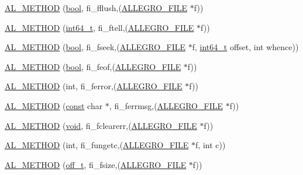 \begin{DoxyCompactItemize}
\item 
\hyperlink{struct_a_l_l_e_g_r_o___f_i_l_e___i_n_t_e_r_f_a_c_e_a03a8721e51960d8219a89e9d731c7f28}{A\+L\+\_\+\+M\+E\+T\+H\+OD} (\hyperlink{astdbool_8h_abb452686968e48b67397da5f97445f5b}{bool}, fi\+\_\+fflush,(\hyperlink{file_8h_a9c6d4681b238d8c79191fd6fcc4bd6f8}{A\+L\+L\+E\+G\+R\+O\+\_\+\+F\+I\+LE} $\ast$f))
\item 
\hyperlink{struct_a_l_l_e_g_r_o___f_i_l_e___i_n_t_e_r_f_a_c_e_acee07e3ccb2fa9cf66827539f3fa2cb6}{A\+L\+\_\+\+M\+E\+T\+H\+OD} (\hyperlink{alwatcom_8h_aa028d750c854cd520247fcab322e276c}{int64\+\_\+t}, fi\+\_\+ftell,(\hyperlink{file_8h_a9c6d4681b238d8c79191fd6fcc4bd6f8}{A\+L\+L\+E\+G\+R\+O\+\_\+\+F\+I\+LE} $\ast$f))
\item 
\hyperlink{struct_a_l_l_e_g_r_o___f_i_l_e___i_n_t_e_r_f_a_c_e_a945082117b99130a77ba7d38bd20a5e4}{A\+L\+\_\+\+M\+E\+T\+H\+OD} (\hyperlink{astdbool_8h_abb452686968e48b67397da5f97445f5b}{bool}, fi\+\_\+fseek,(\hyperlink{file_8h_a9c6d4681b238d8c79191fd6fcc4bd6f8}{A\+L\+L\+E\+G\+R\+O\+\_\+\+F\+I\+LE} $\ast$f, \hyperlink{alwatcom_8h_aa028d750c854cd520247fcab322e276c}{int64\+\_\+t} offset, int whence))
\item 
\hyperlink{struct_a_l_l_e_g_r_o___f_i_l_e___i_n_t_e_r_f_a_c_e_a433eb41daea0bedad5809b0b5797e2e3}{A\+L\+\_\+\+M\+E\+T\+H\+OD} (\hyperlink{astdbool_8h_abb452686968e48b67397da5f97445f5b}{bool}, fi\+\_\+feof,(\hyperlink{file_8h_a9c6d4681b238d8c79191fd6fcc4bd6f8}{A\+L\+L\+E\+G\+R\+O\+\_\+\+F\+I\+LE} $\ast$f))
\item 
\hyperlink{struct_a_l_l_e_g_r_o___f_i_l_e___i_n_t_e_r_f_a_c_e_a8b3555f166ebecd17203b5cb749126ae}{A\+L\+\_\+\+M\+E\+T\+H\+OD} (int, fi\+\_\+ferror,(\hyperlink{file_8h_a9c6d4681b238d8c79191fd6fcc4bd6f8}{A\+L\+L\+E\+G\+R\+O\+\_\+\+F\+I\+LE} $\ast$f))
\item 
\hyperlink{struct_a_l_l_e_g_r_o___f_i_l_e___i_n_t_e_r_f_a_c_e_ae8a8f881762b35503cd954c432fb2d11}{A\+L\+\_\+\+M\+E\+T\+H\+OD} (\hyperlink{zconf_8h_a2c212835823e3c54a8ab6d95c652660e}{const} char $\ast$, fi\+\_\+ferrmsg,(\hyperlink{file_8h_a9c6d4681b238d8c79191fd6fcc4bd6f8}{A\+L\+L\+E\+G\+R\+O\+\_\+\+F\+I\+LE} $\ast$f))
\item 
\hyperlink{struct_a_l_l_e_g_r_o___f_i_l_e___i_n_t_e_r_f_a_c_e_a7735bf3a47d3a6d2a3d928efb9be05d7}{A\+L\+\_\+\+M\+E\+T\+H\+OD} (\hyperlink{png_8h_ac9c84fa68bbad002983e35ce3663c686}{void}, fi\+\_\+fclearerr,(\hyperlink{file_8h_a9c6d4681b238d8c79191fd6fcc4bd6f8}{A\+L\+L\+E\+G\+R\+O\+\_\+\+F\+I\+LE} $\ast$f))
\item 
\hyperlink{struct_a_l_l_e_g_r_o___f_i_l_e___i_n_t_e_r_f_a_c_e_acc54f4f8df3195e7f061dfdb27cee655}{A\+L\+\_\+\+M\+E\+T\+H\+OD} (int, fi\+\_\+fungetc,(\hyperlink{file_8h_a9c6d4681b238d8c79191fd6fcc4bd6f8}{A\+L\+L\+E\+G\+R\+O\+\_\+\+F\+I\+LE} $\ast$f, int c))
\item 
\hyperlink{struct_a_l_l_e_g_r_o___f_i_l_e___i_n_t_e_r_f_a_c_e_ad0064001307ff9a37a54a4d138b3df1e}{A\+L\+\_\+\+M\+E\+T\+H\+OD} (\hyperlink{fshook_8h_ab219cf84f750cf36312b756cb82d5e5e}{off\+\_\+t}, fi\+\_\+fsize,(\hyperlink{file_8h_a9c6d4681b238d8c79191fd6fcc4bd6f8}{A\+L\+L\+E\+G\+R\+O\+\_\+\+F\+I\+LE} $\ast$f))
\end{DoxyCompactItemize}


